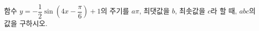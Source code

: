 함수 $y=-\dfrac{1}{2}\sin\left(4x-\dfrac{\pi}{6}\right)+1$의 주기를 $a\pi$, 최댓값을 $b$, 최솟값을 $c$라 할 때, $abc$의 값을 구하시오.
